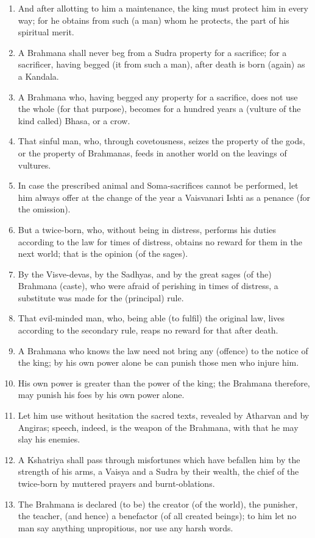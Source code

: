 \begin{enumerate}
\item And after allotting to him a maintenance, the king must protect him in every way; for he obtains from such (a man) whom he protects, the part of his spiritual merit.
\item A Brahmana shall never beg from a Sudra property for a sacrifice; for a sacrificer, having begged (it from such a man), after death is born (again) as a Kandala.
\item A Brahmana who, having begged any property for a sacrifice, does not use the whole (for that purpose), becomes for a hundred years a (vulture of the kind called) Bhasa, or a crow.
\item That sinful man, who, through covetousness, seizes the property of the gods, or the property of Brahmanas, feeds in another world on the leavings of vultures.
\item In case the prescribed animal and Soma-sacrifices cannot be performed, let him always offer at the change of the year a Vaisvanari Ishti as a penance (for the omission).
\item But a twice-born, who, without being in distress, performs his duties according to the law for times of distress, obtains no reward for them in the next world; that is the opinion (of the sages).
\item By the Visve-devas, by the Sadhyas, and by the great sages (of the) Brahmana (caste), who were afraid of perishing in times of distress, a substitute was made for the (principal) rule.
\item That evil-minded man, who, being able (to fulfil) the original law, lives according to the secondary rule, reaps no reward for that after death.
\item A Brahmana who knows the law need not bring any (offence) to the notice of the king; by his own power alone be can punish those men who injure him.
\item His own power is greater than the power of the king; the Brahmana therefore, may punish his foes by his own power alone.
\item Let him use without hesitation the sacred texts, revealed by Atharvan and by Angiras; speech, indeed, is the weapon of the Brahmana, with that he may slay his enemies.
\item A Kshatriya shall pass through misfortunes which have befallen him by the strength of his arms, a Vaisya and a Sudra by their wealth, the chief of the twice-born by muttered prayers and burnt-oblations.
\item The Brahmana is declared (to be) the creator (of the world), the punisher, the teacher, (and hence) a benefactor (of all created beings); to him let no man say anything unpropitious, nor use any harsh words.

\end{enumerate}

